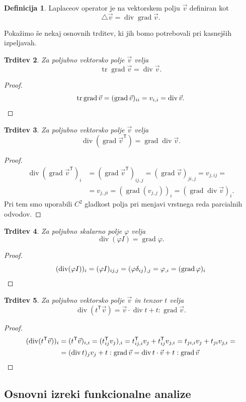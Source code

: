 \documentclass[12pt,a4paper,twoside]{article}
\theoremstyle{definition} %
\newtheorem{definicija}{Definicija}[section]
\theoremstyle{plain} %
\newtheorem{trditev}[definicija]{Trditev}
\numberwithin{equation}{section}
\newcommand{\T}{\mathsf{T}}
\newcommand{\lap}{\triangle}
\renewcommand{\div}{\operatorname{div}}
\newcommand{\grad}{\operatorname{grad}}
\renewcommand{\phi}{\varphi}
\newcommand{\vv}{\vec{v}}
\DeclareMathOperator{\tr}{tr}
\begin{document}
\begin{definicija}
  Laplaceov operator je na vektorskem polju $\vv$ definiran kot
  \[ \lap \vv = \div\grad \vv.  \]
\end{definicija}

Pokažimo še nekaj osnovnih trditev, ki jih bomo potrebovali pri kasnejših
izpeljavah.
\begin{trditev}
  Za poljubno vektorsko polje $\vv$ velja
  \[ \tr\grad \vv = \div \vv. \]
\end{trditev}
\begin{proof}
\[
  \tr\grad\vv = (\grad\vv)_{ii} = v_{i,i} = \div \vv. \qedhere
\]
\end{proof}
\begin{trditev}
  Za poljubno vektorsko polje $\vv$ velja
  \[ \div(\grad\vv^\T) = \grad\div \vv.  \]
\end{trditev}
\begin{proof}
  \begin{align*}
  \div(\grad \vv^\T)_i &= (\grad\vv^\T)_{ij,j} = (\grad \vv)_{ji,j} = v_{j,ij} = \\
  &= v_{j,ji} = (\grad(v_{j,j}))_i = (\grad\div \vv)_i.
  \end{align*}
  Pri tem smo uporabili $C^2$ gladkost polja pri menjavi vrstnega reda parcialnih odvodov.
\end{proof}
\begin{trditev}
  Za poljubno skalarno polje $\phi$ velja
  \[ \div(\phi I) = \grad \phi.  \]
\end{trditev}
\begin{proof}
\[
  (\div(\phi I))_i = (\phi I)_{ij,j} = (\phi \delta_{ij})_{,j} = \phi_{,i} =
  (\grad \phi)_i \qedhere
\]
\end{proof}
\begin{trditev}
  Za poljubno vektorsko polje $\vv$ in tenzor $t$ velja
  \label{trd:div-tv}
  \[
    \div(t^\T \vv) = \vv \cdot \div t + t : \grad\vv.
    \]
\end{trditev}
\begin{proof}
\begin{align*}
  (\div(t^\T \vv))_i &= (t^\T\vv)_{i,i} = (t^\T_{ij} v_j)_{,i} =
    t^\T_{ij,i} v_j + t^\T_{ij} v_{j,i} =
    t_{ji,i} v_j + t_{ji} v_{j,i} = \\
    &=  (\div t)_j v_j + t:\grad \vv = \div t \cdot \vv + t:\grad \vv\qedhere
\end{align*}
\end{proof}

\subsection{Osnovni izreki funkcionalne analize}
\end{document}
